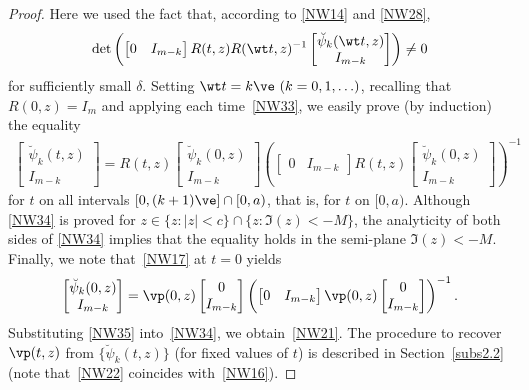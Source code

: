 \begin{proof}
\noindent
Here we used the fact that, according to \eqref{NW14} and \eqref{NW28},
\begin{gather*}
\det \left(
  \begin{bmatrix}0 &I_{m-k} \end{bmatrix}
 R(t,z)R(\wt t,z)^{-1}\begin{bmatrix}\breve \psi_k(\wt t,z) \\ I_{m-k} \end{bmatrix} \right)\not=0
\end{gather*}
for suf\/f\/iciently small $\delta$. Setting $\wt t=k\ve \,\, (k=0,1, \ldots)$, recalling that $R(0,z)=I_m$ and applying each time~\eqref{NW33}, we easily prove (by induction) the equality
\begin{gather} \label{NW34}
\begin{bmatrix}\breve \psi_k( t,z) \\ I_{m-k} \end{bmatrix}
=
R(t,z)\begin{bmatrix}\breve \psi_k(0,z) \\ I_{m-k} \end{bmatrix}
 \left(
  \begin{bmatrix}0 &I_{m-k} \end{bmatrix}
 R(t,z)\begin{bmatrix}\breve \psi_k(0,z) \\ I_{m-k} \end{bmatrix} \right)^{-1}
\end{gather}
for $t$ on all intervals $[0, (k+1) \ve]\cap [0,a)$, that is, for $t$ on $[0,a)$. Although
\eqref{NW34} is proved for $ z \in \{z \colon |z|<c\}\cap \{z \colon \Im(z)<-M\}$, the analyticity
of both sides of \eqref{NW34} implies that the equality holds in the semi-plane $\Im(z)<-M$.
Finally, we note that~\eqref{NW17} at $t=0$ yields
\begin{gather} \label{NW35}
\begin{bmatrix}\breve \psi_k( 0,z) \\ I_{m-k} \end{bmatrix}
=
\vp(0,z)\begin{bmatrix}0 \\ I_{m-k} \end{bmatrix}
 \left(
  \begin{bmatrix}0 &I_{m-k} \end{bmatrix}
 \vp(0,z)\begin{bmatrix} 0 \\ I_{m-k} \end{bmatrix} \right)^{-1}.
\end{gather}
Substituting \eqref{NW35} into~\eqref{NW34}, we obtain~\eqref{NW21}. The procedure to recover
$\vp(t,z)$ from $\{\breve \psi_k(t,z)\}$ (for f\/ixed values of $t$) is described in Section~\ref{subs2.2}
(note that~\eqref{NW22} coincides with~\eqref{NW16}).
\end{proof}
